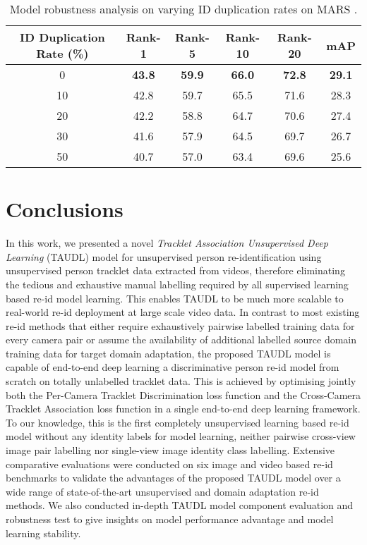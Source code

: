 \documentclass[runningheads]{llncs}
\begin{document}
\begin{table}[h]
	\centering
	\setlength{\tabcolsep}{0.2cm}
	\caption{
		Model robustness analysis on varying ID duplication rates on MARS \cite{zheng2016mars}.
	}
	\label{tab:robustness}
	\begin{tabular}
		{c||c|c|c|c||c}
		\hline
		ID Duplication Rate (\%)	
					& Rank-1 	& Rank-5	& Rank-10	& Rank-20	& mAP  	\\ \hline \hline
		0	 		& \bf 43.8		&\bf  59.9		&\bf  66.0		&\bf  72.8		&\bf 29.1
		\\ \hline
		10	 		& 42.8		& 59.7		& 65.5		& 71.6		& 28.3
		\\ \hline
		20	 		& 42.2		& 58.8		& 64.7		& 70.6		& 27.4
		\\ \hline
		30	 		& 41.6		& 57.9		& 64.5		& 69.7		& 26.7
		\\ \hline
		50 			& 40.7		& 57.0		& 63.4		& 69.6		& 25.6
		\\ \hline
	\end{tabular}
\end{table}



\section{Conclusions}

In this work, we presented a novel {\em Tracklet Association Unsupervised Deep Learning} (TAUDL) model for
unsupervised person re-identification using unsupervised person
tracklet data extracted from videos, therefore eliminating the
tedious and exhaustive manual labelling required by all supervised
learning based re-id model learning. This enables TAUDL to be much
more scalable to real-world re-id deployment at large scale video data. 
In contrast to most existing re-id methods
that either require exhaustively pairwise labelled training data for
every camera pair or 
assume the availability of additional labelled source domain training data for target domain adaptation, 
the proposed TAUDL model is capable of 
end-to-end deep learning a discriminative person re-id model from scratch
on totally unlabelled tracklet data. 
This is achieved by optimising jointly both
the Per-Camera Tracklet Discrimination loss function
and 
the Cross-Camera Tracklet Association loss function
in a single end-to-end deep learning framework.
To our knowledge, this is the first completely unsupervised learning
based re-id model without any identity labels for model learning,
neither pairwise cross-view image pair labelling nor single-view image
identity class labelling.
Extensive comparative evaluations were conducted on six image and video based re-id benchmarks 
to validate the advantages of
the proposed TAUDL model over a wide range of state-of-the-art 
unsupervised and domain adaptation re-id methods.
We also conducted in-depth TAUDL model component evaluation
and robustness test to give insights on 
model performance advantage and model learning stability.
\end{document}
